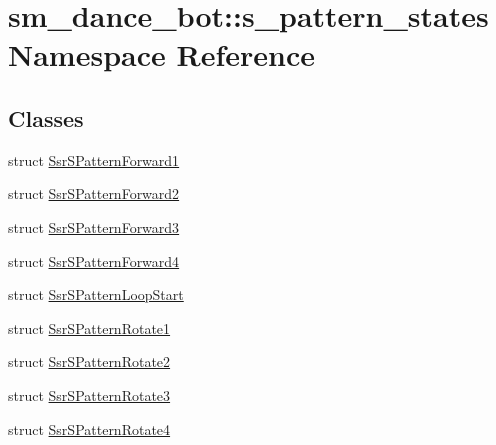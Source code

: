 \hypertarget{namespacesm__dance__bot_1_1s__pattern__states}{}\section{sm\+\_\+dance\+\_\+bot\+:\+:s\+\_\+pattern\+\_\+states Namespace Reference}
\label{namespacesm__dance__bot_1_1s__pattern__states}
\subsection*{Classes}
\begin{DoxyCompactItemize}
\item 
struct \hyperlink{structsm__dance__bot_1_1s__pattern__states_1_1SsrSPatternForward1}{Ssr\+S\+Pattern\+Forward1}
\item 
struct \hyperlink{structsm__dance__bot_1_1s__pattern__states_1_1SsrSPatternForward2}{Ssr\+S\+Pattern\+Forward2}
\item 
struct \hyperlink{structsm__dance__bot_1_1s__pattern__states_1_1SsrSPatternForward3}{Ssr\+S\+Pattern\+Forward3}
\item 
struct \hyperlink{structsm__dance__bot_1_1s__pattern__states_1_1SsrSPatternForward4}{Ssr\+S\+Pattern\+Forward4}
\item 
struct \hyperlink{structsm__dance__bot_1_1s__pattern__states_1_1SsrSPatternLoopStart}{Ssr\+S\+Pattern\+Loop\+Start}
\item 
struct \hyperlink{structsm__dance__bot_1_1s__pattern__states_1_1SsrSPatternRotate1}{Ssr\+S\+Pattern\+Rotate1}
\item 
struct \hyperlink{structsm__dance__bot_1_1s__pattern__states_1_1SsrSPatternRotate2}{Ssr\+S\+Pattern\+Rotate2}
\item 
struct \hyperlink{structsm__dance__bot_1_1s__pattern__states_1_1SsrSPatternRotate3}{Ssr\+S\+Pattern\+Rotate3}
\item 
struct \hyperlink{structsm__dance__bot_1_1s__pattern__states_1_1SsrSPatternRotate4}{Ssr\+S\+Pattern\+Rotate4}
\end{DoxyCompactItemize}
